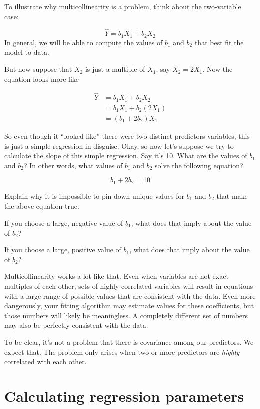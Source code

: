 \documentclass[
]{book}
\begin{document}
To illustrate why multicollinearity is a problem, think about the two-variable case:

\[
\hat{Y} = b_{1}X_{1} + b_{2}X_{2}
\]
In general, we will be able to compute the values of \(b_{1}\) and \(b_{2}\) that best fit the model to data.

But now suppose that \(X_{2}\) is just a multiple of \(X_{1}\), say \(X_{2} = 2X_{1}\). Now the equation looks more like

\begin{align}
\hat{Y} &= b_{1}X_{1} + b_{2}X_{2} \\
        &= b_{1}X_{1} + b_{2}(2 X_{1}) \\
        &= (b_{1} + 2b_{2})X_{1}
\end{align}

So even though it ``looked like'' there were two distinct predictors variables, this is just a simple regression in disguise. Okay, so now let's suppose we try to calculate the slope of this simple regression. Say it's 10. What are the values of \(b_{1}\) and \(b_{2}\)? In other words, what values of \(b_{1}\) and \(b_{2}\) solve the following equation?

\[
b_{1} + 2b_{2} = 10
\]

Explain why it is impossible to pin down unique values for \(b_{1}\) and \(b_{2}\) that make the above equation true.

If you choose a large, negative value of \(b_{1}\), what does that imply about the value of \(b_{2}\)?

If you choose a large, positive value of \(b_{1}\), what does that imply about the value of \(b_{2}\)?

Multicollinearity works a lot like that. Even when variables are not exact multiples of each other, sets of highly correlated variables will result in equations with a large range of possible values that are consistent with the data. Even more dangerously, your fitting algorithm may estimate values for these coefficients, but those numbers will likely be meaningless. A completely different set of numbers may also be perfectly consistent with the data.

To be clear, it's not a problem that there is covariance among our predictors. We expect that. The problem only arises when two or more predictors are \emph{highly} correlated with each other.

\hypertarget{multiple-calculating}{%
\section{Calculating regression parameters}\label{multiple-calculating}}
\end{document}
